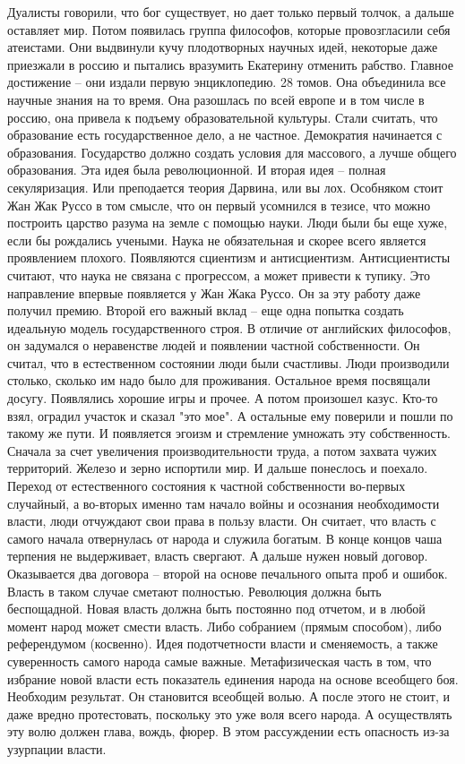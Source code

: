 \documentclass[a4paper, 12pt]{article}
\begin{document}
Дуалисты говорили, что бог существует, но дает только первый толчок, а дальше оставляет мир. Потом появилась группа философов, которые провозгласили себя атеистами. Они выдвинули кучу плодотворных научных идей, некоторые даже приезжали в россию и пытались вразумить Екатерину отменить рабство. Главное достижение -- они издали первую энциклопедию. 28 томов. Она объединила все научные знания на то время. Она разошлась по всей европе и в том числе в россию, она привела к подъему образовательной культуры. Стали считать, что образование есть государственное дело, а не частное. Демократия начинается с образования. Государство должно создать условия для массового, а лучше общего образования. Эта идея была революционной. И вторая идея -- полная секуляризация. Или преподается теория Дарвина, или вы лох. Особняком стоит Жан Жак Руссо в том смысле, что он первый усомнился в тезисе, что можно построить царство разума на земле с помощью науки. Люди были бы еще хуже, если бы рождались учеными. Наука не обязательная и скорее всего является проявлением плохого. Появляются сциентизм и антисциентизм. Антисциентисты считают, что наука не связана с прогрессом, а может привести к тупику. Это направление впервые появляется у Жан Жака Руссо. Он за эту работу даже получил премию. Второй его важный вклад -- еще одна попытка создать идеальную модель государственного строя. В отличие от английских философов, он задумался о неравенстве людей и появлении частной собственности. Он считал, что в естественном состоянии люди были счастливы. Люди производили столько, сколько им надо было для проживания. Остальное время посвящали досугу. Появлялись хорошие игры и прочее. А потом произошел казус. Кто-то взял, оградил участок и сказал "это мое". А остальные ему поверили и пошли по такому же пути. И появляется эгоизм и стремление умножать эту собственность. Сначала за счет увеличения производительности труда, а потом захвата чужих территорий. Железо и зерно испортили мир. И дальше понеслось и поехало. Переход от естественного состояния к частной собственности во-первых случайный, а во-вторых именно там начало войны и осознания необходимости власти, люди отчуждают свои права в пользу власти. Он считает, что власть с самого начала отвернулась от народа и служила богатым. В конце концов чаша терпения не выдерживает, власть свергают. А дальше нужен новый договор. Оказывается два договора -- второй на основе печального опыта проб и ошибок. Власть в таком случае сметают полностью. Революция должна быть беспощадной. Новая власть должна быть постоянно под отчетом, и в любой момент народ может смести власть. Либо собранием (прямым способом), либо референдумом (косвенно). Идея подотчетности власти и сменяемость, а также суверенность самого народа самые важные. Метафизическая часть в том, что избрание новой власти есть показатель единения народа на основе всеобщего боя. Необходим результат. Он становится всеобщей волью. А после этого не стоит, и даже вредно протестовать, поскольку это уже воля всего народа. А осуществлять эту волю должен глава, вождь, фюрер. В этом рассуждении есть опасность из-за узурпации власти. 
\end{document}
